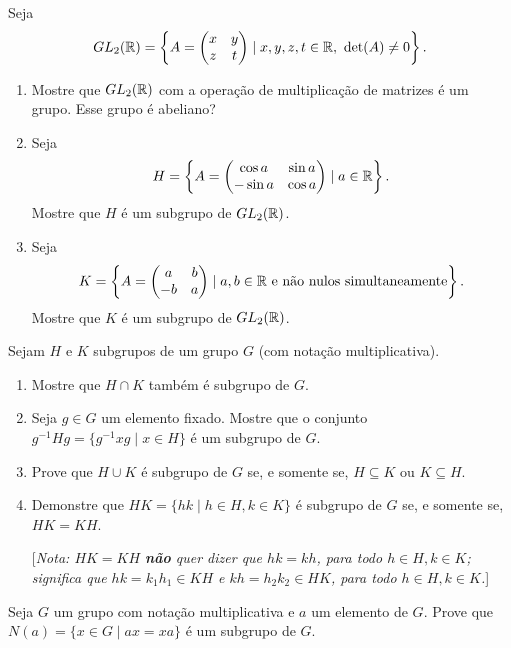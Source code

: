 \documentclass[12pt]{exam}
\begin{document}
    \questao{} Seja
    \[
      GL_2(\mathbb{R}) = \left\{A = \begin{pmatrix}
          x & y\\z & t
      \end{pmatrix} \mid x, y, z, t \in \mathbb{R},\ \det(A) \ne 0\right\}.
    \]
    \begin{enumerate}[label=({\alph*})]
      \item Mostre que $GL_2(\mathbb{R})$ com a opera\c{c}\~ao de multiplica\c{c}\~ao de matrizes \'e um grupo. Esse grupo \'e abeliano?
      \item Seja
      \[
          H = \left\{ A = \begin{pmatrix}
              \cos a & \sin a\\ -\sin a & \cos a
          \end{pmatrix} \mid a \in \mathbb{R}\right\}.
      \]
      Mostre que $H$ \'e um subgrupo de $GL_2(\mathbb{R})$.
      \item Seja
      \[
          K = \left\{ A = \begin{pmatrix}
              a & b\\ -b & a
          \end{pmatrix} \mid a, b \in \mathbb{R} \mbox{ e n\~ao nulos simultaneamente}\right\}.
      \]
      Mostre que $K$ \'e um subgrupo de $GL_2(\mathbb{R})$.
    \end{enumerate}

    \questao{} Sejam $H$ e $K$ subgrupos de um grupo $G$ (com nota{\c c}{\~a}o
    multiplicativa).
    \begin{enumerate}[label=({\alph*})]
    \item Mostre que $H\cap K$ tamb{\'e}m {\'e} subgrupo de $G$.
    \item Seja $g\in G$ um elemento fixado. Mostre que o conjunto
    $g^{-1}Hg=\{ g^{-1}xg \mid x\in H \} $ {\'e} um subgrupo de $G$.
    \item Prove que $H\cup K$ {\'e} subgrupo de $G$ se, e somente se,
    $H\subseteq K$ ou $K\subseteq H$.
    \item Demonstre que $HK=\{hk \mid h\in H, k\in K\}$ {\'e} subgrupo
    de $G$ se, e somente se, $HK=KH$.

    [\emph{Nota: $HK=KH$ \textbf{n{\~a}o} quer dizer que $hk=kh$,
    para todo $h\in H, k\in K$; significa que $hk=k_1h_1 \in KH$ e $kh=h_2k_2 \in
    HK$, para todo $h\in H, k\in K$.}]
    \end{enumerate}

    \vspace{.3cm}
    \questao{} Seja $G$ um grupo com nota\c{c}\~ao multiplicativa e $a$ um elemento de $G$. Prove que $N(a) = \{x \in G \mid ax = xa\}$ \'e um subgrupo de $G$.
\end{document}
